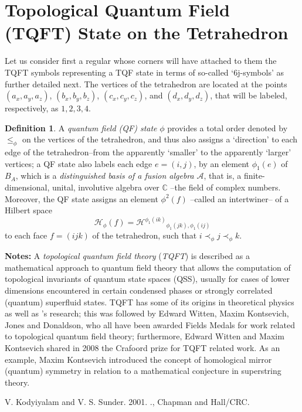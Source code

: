 \documentclass[12pt]{article}
\theoremstyle{plain}
\theoremstyle{definition}
\newtheorem{definition}{Definition}[section]
\numberwithin{equation}{section}
\newcommand{\A}{\mathcal A}
\renewcommand{\H}{\mathcal H}
\newcommand{\<}{{\langle}}
\begin{document}
\section{Topological Quantum Field (TQFT) State on the Tetrahedron}


Let us consider first a regular  whose corners will
have attached to them the TQFT symbols representing a TQF state in terms of so-called `6j-symbols' as further detailed next. The vertices of the tetrahedron are located at the points $(a_x, a_y, a_z)$, $(b_x, b_y, b_z)$, $(c_x, c_y, c_z)$, and $(d_x, d_y, d_z)$, that will be labeled, respectively, as $1,2,3,4$. 

\begin{definition}
A \emph{quantum field (QF) state} $\phi$ provides a total order denoted by $ \leq_{\phi}$ on the 
vertices of the tetrahedron, and thus also assigns a `direction' to each edge of the tetrahedron--from the 
apparently `smaller' to the apparently `larger' vertices; a QF state also labels each edge $ e = (i,j)$,
by an element $\phi_1 (e)$ of  $B_A$, which is a \emph{distinguished basis of a fusion algebra} $\A$, that is, a finite-dimensional, unital, involutive algebra over $\mathbb{C}$ --the field of complex numbers. Moreover, the QF state assigns an element ${\phi}^2 (f)$ --called an intertwiner-- of a Hilbert space 
$$\H_{\phi}(f)= {\H^{\phi_1 (ik)}}_{\phi_1 (jk), \phi_1 (ij)}$$ 
to each face $f=(ijk)$ of the tetrahedron, such that $i\prec_{\phi} j \prec_{\phi}k .$ 
\end{definition}

\textbf{Notes:}
A \emph{topological quantum field theory} ({\em TQFT}) is described as a mathematical approach to quantum field theory that allows the computation of topological invariants of quantum state spaces (QSS), usually for cases of lower dimensions encountered in certain condensed phases or strongly correlated (quantum) superfluid states. TQFT has some of its origins in theoretical physics as well as 's research; this was followed by Edward Witten, Maxim Kontsevich, Jones and Donaldson, who all have been awarded Fields Medals for work related to topological quantum field theory; furthermore, Edward Witten and Maxim Kontsevich shared in 2008 the Crafoord prize for TQFT related work. As an example, Maxim Kontsevich introduced the concept of homological mirror (quantum) symmetry in relation to a mathematical conjecture in superstring theory.

\begin{thebibliography}{9}

V. Kodyiyalam and V. S. Sunder. 2001. 
 ., Chapman and Hall/CRC. 

\end{thebibliography}
\end{document}
